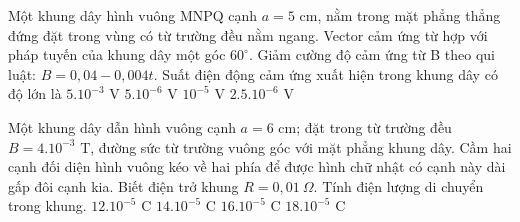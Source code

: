 \begin{vidu}%
Một khung dây hình vuông MNPQ cạnh $a = 5$ cm, nằm trong mặt phẳng thẳng đứng đặt trong vùng có từ trường đều nằm ngang. Vector cảm ứng từ hợp với pháp tuyến của khung dây một góc $60^\circ$. Giảm cường độ cảm ứng từ B theo qui luật: $B=0,04-0,004t$. Suất điện động cảm ứng xuất hiện trong khung dây có độ lớn là
\choice
{$5.10^{-3}$ V}
{\True $5.10^{-6}$ V}
{$10^{-5}$ V}
{$2.5.10^{-6}$ V}
\end{vidu}
\begin{vidu}%
Một khung dây dẫn hình vuông cạnh $a = 6$ cm; đặt trong từ trường đều $B = 4.10^{-3}$ T, đường sức từ trường vuông góc với mặt phẳng khung dây. Cầm hai cạnh đối diện hình vuông kéo về hai phía để được hình chữ nhật có cạnh này dài gấp đôi cạnh kia. Biết điện trở khung $R = 0, 01\ \Omega$. Tính điện lượng di chuyển trong khung.
\choice
{$12. 10^{-5}$ C}
{$14. 10^{-5}$ C}
{\True $16. 10^{-5}$ C}
{$18. 10^{-5}$ C}
\end{vidu}